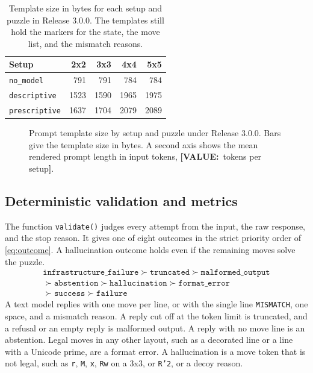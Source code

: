 \documentclass[10pt,twocolumn,letterpaper]{article}
\newcommand{\val}[1]{{\color{red!70!black}\textbf{[VALUE:}~#1\textbf{]}}}
\newcommand{\code}[1]{\texttt{#1}}
\begin{document}
\begin{table}[t]
\caption{Template size in bytes for each setup and puzzle in Release 3.0.0. The templates still hold the markers for the state, the move list, and the mismatch reasons.}
\label{tab:prompt-bytes}
\small
\begin{tabularx}{\linewidth}{@{}Xrrrr@{}}
\toprule
Setup & 2x2 & 3x3 & 4x4 & 5x5 \\
\midrule
\code{no\_model}     & 791  & 791  & 784  & 784  \\
\code{descriptive}  & 1523 & 1590 & 1965 & 1975 \\
\code{prescriptive} & 1637 & 1704 & 2079 & 2089 \\
\bottomrule
\end{tabularx}
\end{table}

\begin{figure}[t]
\caption{Prompt template size by setup and puzzle under Release 3.0.0. Bars give the template size in bytes. A second axis shows the mean rendered prompt length in input tokens, \val{tokens per setup}.}
\label{fig:prompt-sizes}
\end{figure}

\subsection{Deterministic validation and metrics}\label{sec:metrics}
The function \code{validate()} judges every attempt from the input, the raw response, and the stop reason. It gives one of eight outcomes in the strict priority order of \cref{eq:outcome}. A hallucination outcome holds even if the remaining moves solve the puzzle.
\begin{equation}
\begin{gathered}
\texttt{infrastructure\_failure} \succ \texttt{truncated} \succ \texttt{malformed\_output}\\
\succ \texttt{abstention} \succ \texttt{hallucination} \succ \texttt{format\_error}\\
\succ \texttt{success} \succ \texttt{failure}
\end{gathered}
\label{eq:outcome}
\end{equation}
A text model replies with one move per line, or with the single line \code{MISMATCH}, one space, and a mismatch reason. A reply cut off at the token limit is truncated, and a refusal or an empty reply is malformed output. A reply with no move line is an abstention. Legal moves in any other layout, such as a decorated line or a line with a Unicode prime, are a format error. A hallucination is a move token that is not legal, such as \code{r}, \code{M}, \code{x}, \code{Rw} on a 3x3, or \code{R'2}, or a decoy reason.
\end{document}
